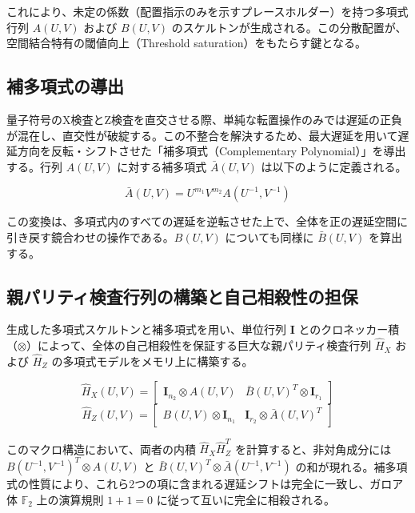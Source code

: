 \documentclass[12pt]{article}
\begin{document}
これにより、未定の係数（配置指示のみを示すプレースホルダー）を持つ多項式行列 $A(U,V)$ および $B(U,V)$ のスケルトンが生成される。この分散配置が、空間結合特有の閾値向上（Threshold saturation）をもたらす鍵となる。

\subsection{補多項式の導出}
量子符号のX検査とZ検査を直交させる際、単純な転置操作のみでは遅延の正負が混在し、直交性が破綻する。この不整合を解決するため、最大遅延を用いて遅延方向を反転・シフトさせた「補多項式（Complementary Polynomial）」を導出する。行列 $A(U,V)$ に対する補多項式 $\bar{A}(U,V)$ は以下のように定義される。

\begin{equation}
    \bar{A}(U,V) = U^{m_1}V^{m_2}A(U^{-1}, V^{-1})
\end{equation}

この変換は、多項式内のすべての遅延を逆転させた上で、全体を正の遅延空間に引き戻す鏡合わせの操作である。$B(U,V)$ についても同様に $\bar{B}(U,V)$ を算出する。

\subsection{親パリティ検査行列の構築と自己相殺性の担保}
生成した多項式スケルトンと補多項式を用い、単位行列 $\mathbf{I}$ とのクロネッカー積（$\otimes$）によって、全体の自己相殺性を保証する巨大な親パリティ検査行列 $\hat{H}_X$ および $\hat{H}_Z$ の多項式モデルをメモリ上に構築する。

\begin{equation}
    \hat{H}_X(U,V) = \begin{bmatrix} \mathbf{I}_{n_2} \otimes A(U,V) & \bar{B}(U,V)^T \otimes \mathbf{I}_{r_1} \end{bmatrix}
\end{equation}
\begin{equation}
    \hat{H}_Z(U,V) = \begin{bmatrix} B(U,V) \otimes \mathbf{I}_{n_1} & \mathbf{I}_{r_2} \otimes \bar{A}(U,V)^T \end{bmatrix}
\end{equation}

このマクロ構造において、両者の内積 $\hat{H}_X \hat{H}_Z^T$ を計算すると、非対角成分には $B(U^{-1}, V^{-1})^T \otimes A(U,V)$ と $\bar{B}(U,V)^T \otimes \bar{A}(U^{-1}, V^{-1})$ の和が現れる。補多項式の性質により、これら2つの項に含まれる遅延シフトは完全に一致し、ガロア体 $\mathbb{F}_2$ 上の演算規則 $1+1=0$ に従って互いに完全に相殺される。
\end{document}
